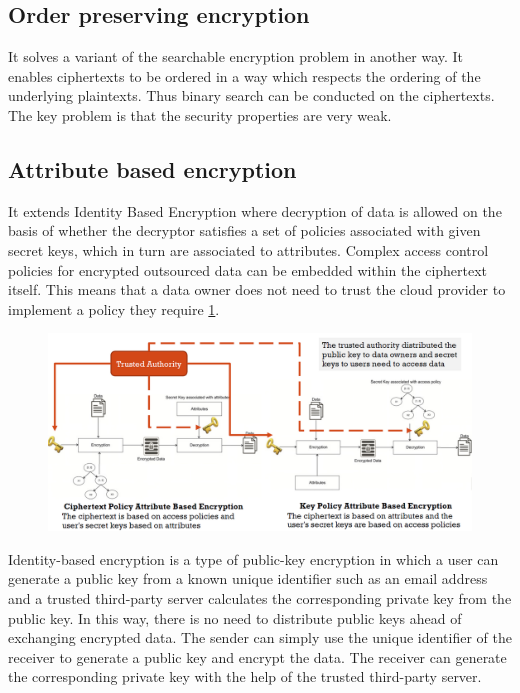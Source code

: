 \subsection{Order preserving encryption}
It solves a variant of the searchable encryption problem in another way. It enables ciphertexts to be ordered in a way which respects the ordering of the underlying plaintexts. Thus binary search can be conducted on the ciphertexts. The key problem is that the security properties are very weak.

\subsection{Attribute based encryption}

It extends Identity Based Encryption where decryption of data is allowed on the basis of whether the decryptor satisfies a set of policies associated with given secret keys, which in turn are associated to attributes. Complex access control policies for encrypted outsourced data can be embedded within the ciphertext itself. This means that a data owner does not need to trust the cloud provider to implement a policy they require \ref{fig:attributebased}.

\begin{figure}
	\centering
	\includegraphics[width=0.7\linewidth]{Images/Chapter8/attribute_based}
	\caption{}
	\label{fig:attributebased}
\end{figure}

Identity-based encryption is a type of public-key encryption in which a user can generate a public key from a known unique identifier such as an email address and a trusted third-party server calculates the corresponding private key from the public key. In this way, there is no need to distribute public keys ahead of exchanging encrypted data. The sender can simply use the unique identifier of the receiver to generate a public key and encrypt the data. The receiver can generate the corresponding private key with the help of the trusted third-party server.

